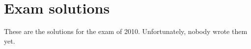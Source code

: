 \documentclass[main]{subfiles}
\begin{document}

\section{Exam solutions}
These are the solutions for the exam of 2010. Unfortunately, nobody wrote them yet.
\end{document}
